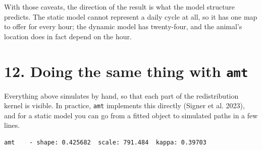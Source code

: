\documentclass[
  letterpaper,
  DIV=11,
  numbers=noendperiod]{scrartcl}
\newenvironment{Shaded}{\begin{snugshade}}{\end{snugshade}}
\newcommand{\CommentTok}[1]{\textcolor[rgb]{0.37,0.37,0.37}{#1}}
\newcommand{\DecValTok}[1]{\textcolor[rgb]{0.68,0.00,0.00}{#1}}
\newcommand{\FunctionTok}[1]{\textcolor[rgb]{0.28,0.35,0.67}{#1}}
\newcommand{\NormalTok}[1]{\textcolor[rgb]{0.00,0.23,0.31}{#1}}
\newcommand{\OtherTok}[1]{\textcolor[rgb]{0.00,0.23,0.31}{#1}}
\newcommand{\SpecialCharTok}[1]{\textcolor[rgb]{0.37,0.37,0.37}{#1}}
\newcommand{\StringTok}[1]{\textcolor[rgb]{0.13,0.47,0.30}{#1}}
\begin{document}
With those caveats, the direction of the result is what the model
structure predicts. The static model cannot represent a daily cycle at
all, so it has one map to offer for every hour; the dynamic model has
twenty-four, and the animal's location does in fact depend on the hour.

\section{\texorpdfstring{12. Doing the same thing with
\texttt{amt}}{12. Doing the same thing with amt}}\label{doing-the-same-thing-with-amt}

Everything above simulates by hand, so that each part of the
redistribution kernel is visible. In practice, \texttt{amt} implements
this directly (Signer et al. 2023), and for a static model you can go
from a fitted object to simulated paths in a few lines.

\begin{Shaded}
\end{Shaded}

\begin{verbatim}
amt    - shape: 0.425682  scale: 791.484  kappa: 0.39703 
\end{verbatim}
\end{document}

